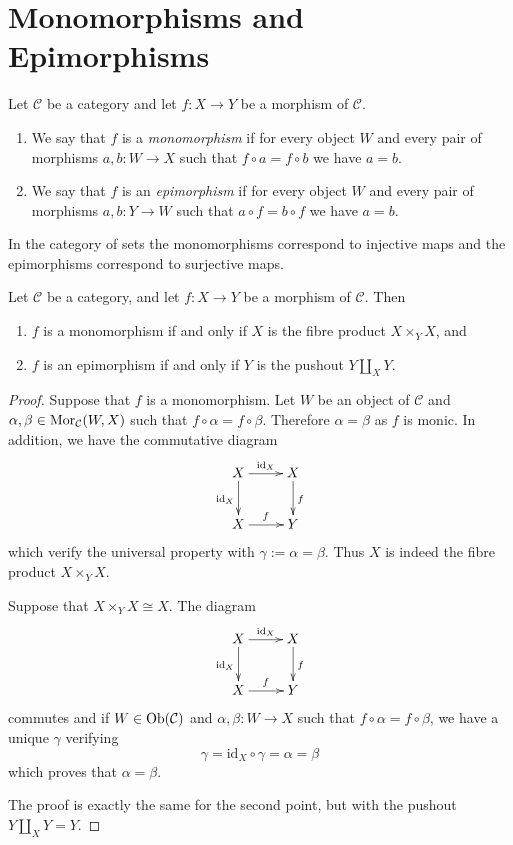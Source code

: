 \section{Monomorphisms and Epimorphisms}
\label{section-mono-epi}

\begin{definition}
\label{definition-mono-epi}
Let $\mathcal{C}$ be a category and let $f : X \to Y$ be
a morphism of $\mathcal{C}$.
\begin{enumerate}
\item We say that $f$ is a {\it monomorphism} if for every object
$W$ and every pair of morphisms $a, b : W \to X$ such that
$f \circ a = f \circ b$ we have $a = b$.
\item We say that $f$ is an {\it epimorphism} if for every object
$W$ and every pair of morphisms $a, b : Y \to W$ such that
$a \circ f = b \circ f$ we have $a = b$.
\end{enumerate}
\end{definition}

\begin{example}
\label{example-mono-epi-sets}
In the category of sets the monomorphisms correspond to injective
maps and the epimorphisms correspond to surjective maps.
\end{example}

\begin{lemma}
\label{lemma-characterize-mono-epi}
Let $\mathcal{C}$ be a category, and let $f : X \to Y$ be
a morphism of $\mathcal{C}$. Then
\begin{enumerate}
\item $f$ is a monomorphism if and only if $X$ is the fibre
product $X \times_Y X$, and
\item $f$ is an epimorphism if and only if $Y$ is the pushout
$Y \amalg_X Y$.
\end{enumerate}
\end{lemma}

\begin{proof}
Suppose that $f$ is a monomorphism. Let $W$ be an object of $\mathcal C$
and $\alpha, \beta \in \mathop{\mathrm{Mor}}\nolimits_\mathcal C(W,X)$ such that $f\circ \alpha = f\circ
\beta$. Therefore $\alpha = \beta$ as $f$ is monic. In addition, we have the
commutative diagram
$$
\xymatrix{
X \ar[r]^{\text{id}_X} \ar[d]_{\text{id}_X} & X \ar[d]^{f} \\
X \ar[r]^{f} & Y
}
$$
which verify the universal property with $\gamma := \alpha = \beta$.
Thus $X$ is indeed the fibre product $X\times_Y X$.

\medskip\noindent
Suppose that $X \times_Y X \cong X $. The diagram
$$
\xymatrix{
X \ar[r]^{\text{id}_X} \ar[d]_{\text{id}_X} & X \ar[d]^{f} \\
X \ar[r]^{f} & Y }
$$
commutes and if $W \in \mathop{\mathrm{Ob}}\nolimits(\mathcal C)$ and $\alpha, \beta : W \to X$
such that $f \circ \alpha = f \circ \beta$, we have a unique
$\gamma$ verifying
$$
\gamma = \text{id}_X\circ\gamma = \alpha = \beta
$$
which proves that $\alpha = \beta$.

\medskip\noindent
The proof is exactly the same for the second point, but with the
pushout $Y\amalg_X Y = Y$.
\end{proof}





